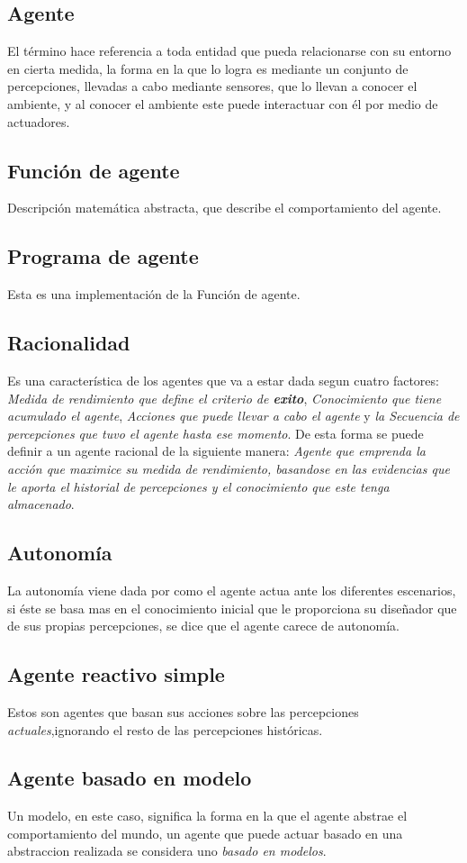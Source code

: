 \documentclass{article}
\begin{document}
\subsection{Agente}
El t\'ermino hace referencia a toda entidad que pueda relacionarse con su entorno en cierta medida, la forma en la que lo logra es mediante un conjunto de percepciones, llevadas a cabo mediante sensores, que lo llevan a conocer el ambiente, y al conocer el ambiente este puede interactuar con \'el por medio de actuadores.
\subsection{Funci\'on de agente}
Descripci\'on matem\'atica abstracta, que describe el comportamiento del agente.
\subsection{Programa de agente}
Esta es una implementaci\'on de la Funci\'on de agente.
\subsection{Racionalidad}
Es una caracter\'istica de los agentes que va a estar dada segun cuatro factores: \textit{Medida de rendimiento que define el criterio de \textbf{exito}}, \textit{Conocimiento que tiene acumulado el agente}, \textit{Acciones que puede llevar a cabo el agente} y \textit{la Secuencia de percepciones que tuvo el agente hasta ese momento}. De esta forma se puede definir a un agente racional de la siguiente manera:
\textit{Agente que emprenda la acci\'on que maximice su medida de rendimiento, basandose en las evidencias que le aporta el historial de percepciones y el conocimiento que este tenga almacenado}.
\subsection{Autonom\'ia}
La autonom\'ia viene dada por como el agente actua ante los diferentes escenarios, si \'este se basa mas en el conocimiento inicial que le proporciona su dise\~{n}ador que de sus propias percepciones, se dice que el agente carece de autonom\'ia.
\subsection{Agente reactivo simple}
Estos son agentes que basan sus acciones sobre las percepciones \textit{actuales},ignorando el resto de las percepciones hist\'oricas.
\subsection{Agente basado en modelo}
Un modelo, en este caso, significa la forma en la que el agente abstrae el comportamiento del mundo, un agente que puede actuar basado en una abstraccion realizada se considera uno \textit{basado en modelos}.
\end{document}
